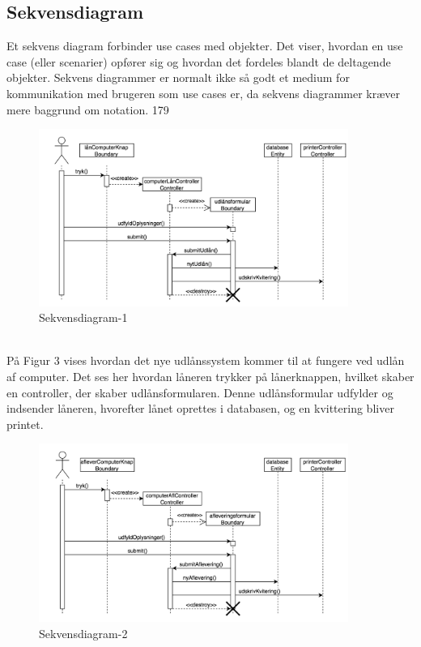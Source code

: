 \documentclass[a4paper]{article}
\begin{document}
\subsection{Sekvensdiagram}
Et sekvens diagram forbinder use cases med objekter. Det viser, hvordan en use case (eller scenarier) opfører sig og hvordan det fordeles blandt de deltagende objekter. Sekvens diagrammer er normalt ikke så godt et medium for kommunikation med brugeren som use cases er, da sekvens diagrammer kræver mere baggrund om notation. \cite{OOSE}{179} 
\begin{figure}[h!]
\includegraphics[width=0.9\textwidth]{SekvensLaan}
  \caption{Sekvensdiagram-1}
  \centering
\end{figure}\\
På Figur 3 vises hvordan det nye udlånssystem kommer til at fungere ved udlån af computer. Det ses her hvordan låneren trykker på lånerknappen, hvilket skaber en controller, der skaber udlånsformularen. Denne udlånsformular udfylder og indsender låneren, hvorefter lånet oprettes i databasen, og en kvittering bliver printet.
\newpage
\begin{figure}[h!]
\includegraphics[width=0.9\textwidth]{SekvensAflever}
  \caption{Sekvensdiagram-2}
  \centering
\end{figure}
\end{document}
